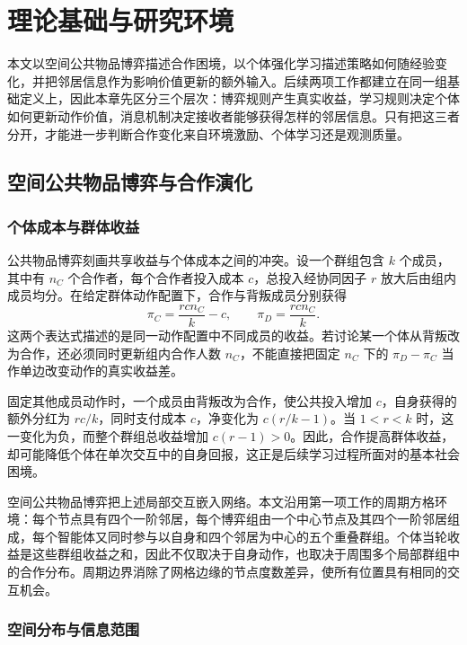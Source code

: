 \chapter{理论基础与研究环境}
\label{chap:foundations}

本文以空间公共物品博弈描述合作困境，以个体强化学习描述策略如何随经验变化，并把邻居信息作为影响价值更新的额外输入。后续两项工作都建立在同一组基础定义上，因此本章先区分三个层次：博弈规则产生真实收益，学习规则决定个体如何更新动作价值，消息机制决定接收者能够获得怎样的邻居信息。只有把这三者分开，才能进一步判断合作变化来自环境激励、个体学习还是观测质量。

\section{空间公共物品博弈与合作演化}
\subsection{个体成本与群体收益}

公共物品博弈刻画共享收益与个体成本之间的冲突。设一个群组包含 $k$ 个成员，其中有 $n_C$ 个合作者，每个合作者投入成本 $c$，总投入经协同因子 $r$ 放大后由组内成员均分。在给定群体动作配置下，合作与背叛成员分别获得
\begin{equation}
 \pi_C=\frac{rcn_C}{k}-c,\qquad
 \pi_D=\frac{rcn_C}{k}.
 \label{eq:foundation-group-payoff}
\end{equation}
这两个表达式描述的是同一动作配置中不同成员的收益。若讨论某一个体从背叛改为合作，还必须同时更新组内合作人数 $n_C$，不能直接把固定 $n_C$ 下的 $\pi_D-\pi_C$ 当作单边改变动作的真实收益差。

固定其他成员动作时，一个成员由背叛改为合作，使公共投入增加 $c$，自身获得的额外分红为 $rc/k$，同时支付成本 $c$，净变化为 $c(r/k-1)$。当 $1<r<k$ 时，这一变化为负，而整个群组总收益增加 $c(r-1)>0$。因此，合作提高群体收益，却可能降低个体在单次交互中的自身回报，这正是后续学习过程所面对的基本社会困境。

空间公共物品博弈把上述局部交互嵌入网络。本文沿用第一项工作的周期方格环境\cite{kang2025neighbor}：每个节点具有四个一阶邻居，每个博弈组由一个中心节点及其四个一阶邻居组成，每个智能体又同时参与以自身和四个邻居为中心的五个重叠群组。个体当轮收益是这些群组收益之和，因此不仅取决于自身动作，也取决于周围多个局部群组中的合作分布。周期边界消除了网格边缘的节点度数差异，使所有位置具有相同的交互机会。

\subsection{空间分布与信息范围}

